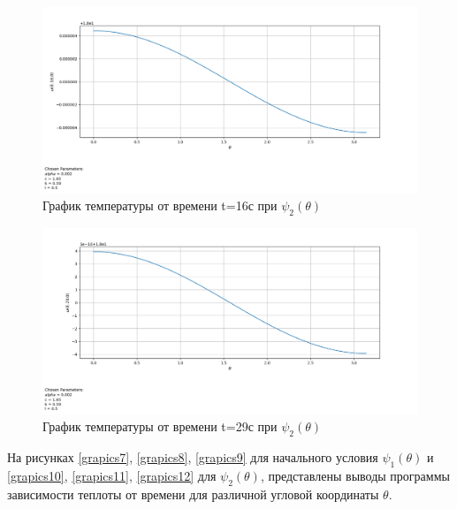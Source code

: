{{\begin{figure}[H]
    \centering                             
	\includegraphics[width=\textwidth,height=\textheight,keepaspectratio]{pos/var_2_t_16.png}                 
	\caption{ График температуры от времени t=16с при $\psi_2(\theta)$}
	\label{grapics5}                           
\end{figure}                                  

\begin{figure}[H]
    \centering                             
	\includegraphics[width=\textwidth,height=\textheight,keepaspectratio]{pos/var_2_t_29.png}                 
	\caption{ График температуры от времени t=29с при $\psi_2(\theta)$}
	\label{grapics6}                           
\end{figure}              

На рисунках \ref{grapics7}, \ref{grapics8}, \ref{grapics9} для начального условия $\psi_1(\theta)$ и \ref{grapics10}, \ref{grapics11}, \ref{grapics12} для $\psi_2(\theta)$, представлены выводы программы зависимости теплоты от времени для различной угловой координаты $\theta$.  

}}
